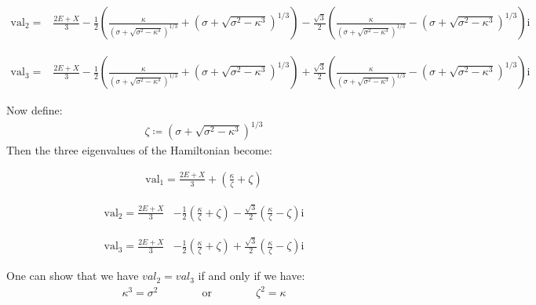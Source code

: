 \documentclass[1pt]{book}
\theoremstyle{break}
\theoremstyle{break}
\begin{document}
\begin{align*}
\text{val}_2 =
&\frac{2E+X}{3}-\frac{1}{2}\left(\frac{\kappa}{{\left(\sigma+\sqrt{{\sigma}^2-{\kappa}^3}\right)}^{1/3}}+{\left(\sigma+\sqrt{{\sigma}^2-{\kappa}^3}\right)}^{1/3}\right)-\frac{\sqrt{3}}{2}\left(\frac{\kappa}{{\left(\sigma+\sqrt{{\sigma}^2-{\kappa}^3}\right)}^{1/3}} -{\left(\sigma+\sqrt{{\sigma}^2-{\kappa}^3}\right)}^{1/3}{}\right)\mathrm{i}
\end{align*}

\begin{align*}
\text{val}_3 =
&\frac{2E+X}{3}-\frac{1}{2}\left(\frac{\kappa}{{\left(\sigma+\sqrt{{\sigma}^2-{\kappa}^3}\right)}^{1/3}}+{\left(\sigma+\sqrt{{\sigma}^2-{\kappa}^3}\right)}^{1/3}\right)+\frac{\sqrt{3}}{2}\left(\frac{\kappa}{{\left(\sigma+\sqrt{{\sigma}^2-{\kappa}^3}\right)}^{1/3}} -{\left(\sigma+\sqrt{{\sigma}^2-{\kappa}^3}\right)}^{1/3}{}\right)\mathrm{i}
\end{align*}

\hfill\break
\hfill\break
Now define:
\begin{align*}
\zeta \coloneqq {\left(\sigma+\sqrt{\sigma^2-\kappa^3}\right)}^{1/3}
\end{align*}
Then the three eigenvalues of the Hamiltonian become:


\begin{align*}
\text{val}_1=\frac{2E+X}{3}+\left(\frac{\kappa}{\zeta}+\zeta\right)
\end{align*}

\begin{align*}
\text{val}_2= \frac{2E+X}{3}
&-\frac{1}{2}\left(\frac{\kappa}{\zeta}+\zeta\right)-\frac{\sqrt{3}}{2}\left(\frac{\kappa}{\zeta}-\zeta\right)\mathrm{i} 
\end{align*}


\begin{align*}
\text{val}_3 = \frac{2E+X}{3}
&-\frac{1}{2}\left(\frac{\kappa}{\zeta}+\zeta\right)+\frac{\sqrt{3}}{2}\left(\frac{\kappa}{\zeta}-\zeta\right)\mathrm{i} 
\end{align*}

One can show that we have $val_2 = val_3$ if and only if we have:
\begin{align*}
\kappa^3 = \sigma^2 \qquad\qquad \text{or}\qquad\qquad \zeta^2 = \kappa
\end{align*}


\newpage
\end{document}
